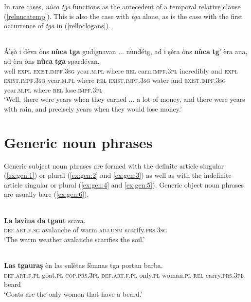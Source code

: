 In rare cases, \textit{nùca tga} functions as the antecedent of a temporal relative clause (\ref{relnucatemp}). This is also the case with \textit{tga} alone, as is the case with the first occurrence of \textit{tga} in (\ref{relloclogans}).

\ea\label{relnucatemp}
\\
\gll Álṣò i dèva òns \textbf{nùca} \textbf{tga} gudignavan ... nùndétg, ad i ṣèra òns \textbf{nùca} \textbf{tg}’ èra aua, ad èra òns \textbf{nùca} \textbf{tga} spardévan.\\
well \textsc{expl} \textsc{exist.impf.3sg} year.\textsc{m.pl} where \textsc{rel} earn.\textsc{impf.3pl} {} incredibly and \textsc{expl} \textsc{exist.impf.3sg} year.\textsc{m.pl} where \textsc{rel} \textsc{exist.impf.3sg} water and \textsc{exist.impf.3sg} year.\textsc{m.pl} where \textsc{rel} lose.\textsc{impf.3pl} \\
\glt `Well, there were years when they earned ... a lot of money, and there were years with rain, and precisely years when they would lose money.'
\z

\section{Generic noun phrases}
Generic subject noun phrases are formed with the definite article singular (\ref{ex:gen:1}) or plural (\ref{ex:gen:2} and \ref{ex:gen:3}) as well as with the indefinite article singular or plural (\ref{ex:gen:4} and \ref{ex:gen:5}). Generic object noun phrases are usually bare (\ref{ex:gen:6}).

\ea
\label{ex:gen:1}
\\
\gll \textbf{La} \textbf{lavina} \textbf{da} \textbf{tgaut} scava.\\
\textsc{def.art.f.sg} avalanche of warm.\textsc{adj.unm} scarify.\textsc{prs.3sg}\\
\glt `The warm weather avalanche scarifies the soil.'
\z


\ea
\label{ex:gen:2}
\\
\gll  \textbf{Las} \textbf{tgauraṣ} èn las sulètas fèmnas tga portan barba.\\
     \textsc{def.art.f.pl} goat.\textsc{pl} \textsc{cop.prs.3pl} \textsc{def.art.f.pl} only.\textsc{pl} woman.\textsc{pl} \textsc{rel} carry.\textsc{prs.3pl} beard\\
\glt `Goats are the only women that have a beard.'
\z

